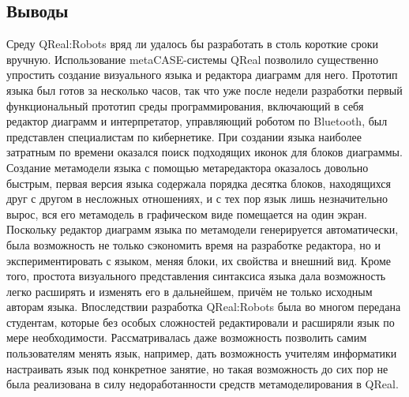 \documentclass[a4paper]{article}
\begin{document}
\subsection{Выводы}
Среду QReal:Robots вряд ли удалось бы разработать в столь короткие сроки вручную. Использование metaCASE-системы QReal позволило существенно упростить создание визуального языка и редактора диаграмм для него. Прототип языка был готов за несколько часов, так что уже после недели разработки первый функциональный прототип среды программирования, включающий в себя редактор диаграмм и интерпретатор, управляющий роботом по Bluetooth, был представлен специалистам по кибернетике. При создании языка наиболее затратным по времени оказался поиск подходящих иконок для блоков диаграммы. Создание метамодели языка с помощью метаредактора оказалось довольно быстрым, первая версия языка содержала порядка десятка блоков, находящихся друг с другом в несложных отношениях, и с тех пор язык лишь незначительно вырос, вся его метамодель в графическом виде помещается на один экран. Поскольку редактор диаграмм языка по метамодели генерируется автоматически, была возможность не только сэкономить время на разработке редактора, но и экспериментировать с языком, меняя блоки, их свойства и внешний вид. Кроме того, простота визуального представления синтаксиса языка дала возможность легко расширять и изменять его в дальнейшем, причём не только исходным авторам языка. Впоследствии разработка QReal:Robots была во многом передана студентам, которые без особых сложностей редактировали и расширяли язык по мере необходимости. Рассматривалась даже возможность позволить самим пользователям менять язык, например, дать возможность учителям информатики настраивать язык под конкретное занятие, но такая возможность до сих пор не была реализована в силу недоработанности средств метамоделирования в QReal.
\end{document}
